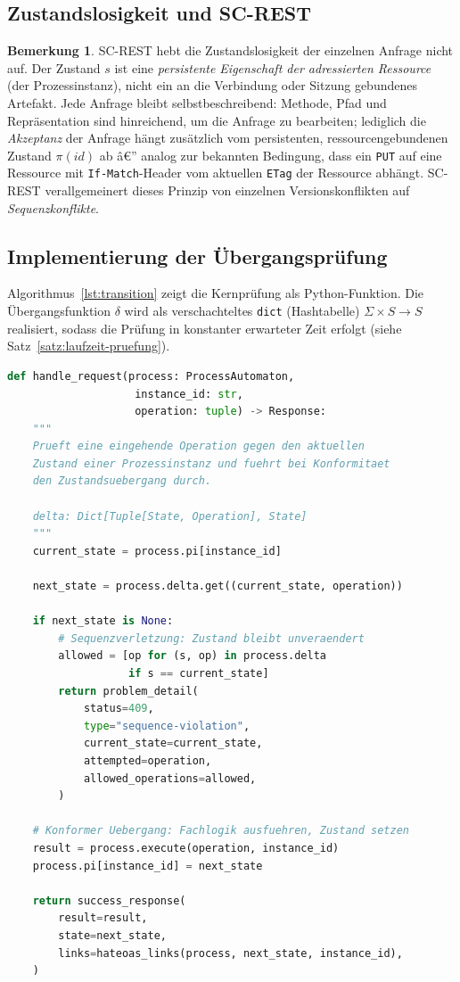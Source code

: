 ﻿\documentclass[a4paper,12pt]{article}
\theoremstyle{definition}
\newtheorem{bemerkung}{Bemerkung}
\begin{document}
\subsection{Zustandslosigkeit und SC-REST}

\begin{bemerkung}
	SC-REST hebt die Zustandslosigkeit der einzelnen Anfrage nicht auf. Der Zustand $s$
	ist eine \emph{persistente Eigenschaft der adressierten Ressource} (der
	Prozessinstanz), nicht ein an die Verbindung oder Sitzung gebundenes Artefakt. Jede
	Anfrage bleibt selbstbeschreibend: Methode, Pfad und Repräsentation sind hinreichend,
	um die Anfrage zu bearbeiten; lediglich die \emph{Akzeptanz} der Anfrage hängt
	zusätzlich vom persistenten, ressourcengebundenen Zustand $\pi(id)$ ab â€” analog zur
	bekannten Bedingung, dass ein \texttt{PUT} auf eine Ressource mit
	\texttt{If-Match}-Header vom aktuellen \texttt{ETag} der Ressource abhängt. SC-REST
	verallgemeinert dieses Prinzip von einzelnen Versionskonflikten auf
	\emph{Sequenzkonflikte}.
\end{bemerkung}

\subsection{Implementierung der Übergangsprüfung}

Algorithmus~\ref{lst:transition} zeigt die Kernprüfung als Python-Funktion. Die
Übergangsfunktion $\delta$ wird als verschachteltes \texttt{dict} (Hashtabelle)
$\Sigma \times S \to S$ realisiert, sodass die Prüfung in konstanter erwarteter Zeit
erfolgt (siehe Satz~\ref{satz:laufzeit-pruefung}).

\begin{lstlisting}[language=Python, label=lst:transition, caption=SC-REST Uebergangspruefung als Middleware-Funktion]
def handle_request(process: ProcessAutomaton,
                    instance_id: str,
                    operation: tuple) -> Response:
    """
    Prueft eine eingehende Operation gegen den aktuellen
    Zustand einer Prozessinstanz und fuehrt bei Konformitaet
    den Zustandsuebergang durch.

    delta: Dict[Tuple[State, Operation], State]
    """
    current_state = process.pi[instance_id]

    next_state = process.delta.get((current_state, operation))

    if next_state is None:
        # Sequenzverletzung: Zustand bleibt unveraendert
        allowed = [op for (s, op) in process.delta
                   if s == current_state]
        return problem_detail(
            status=409,
            type="sequence-violation",
            current_state=current_state,
            attempted=operation,
            allowed_operations=allowed,
        )

    # Konformer Uebergang: Fachlogik ausfuehren, Zustand setzen
    result = process.execute(operation, instance_id)
    process.pi[instance_id] = next_state

    return success_response(
        result=result,
        state=next_state,
        links=hateoas_links(process, next_state, instance_id),
    )
\end{lstlisting}
\end{document}
